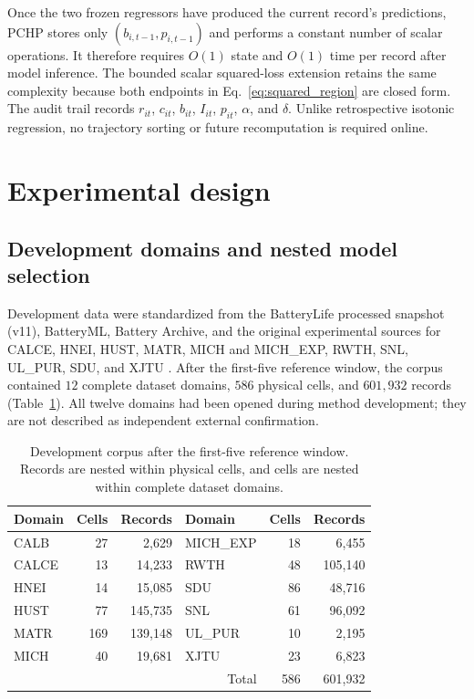 \documentclass[11pt]{article}
\begin{document}
Once the two frozen regressors have produced the current record's predictions, PCHP stores only $(b_{i,t-1},p_{i,t-1})$ and performs a constant number of scalar operations. It therefore requires $O(1)$ state and $O(1)$ time per record after model inference. The bounded scalar squared-loss extension retains the same complexity because both endpoints in Eq.~\eqref{eq:squared_region} are closed form. The audit trail records $r_{it}$, $c_{it}$, $b_{it}$, $I_{it}$, $p_{it}$, $\alpha$, and $\delta$. Unlike retrospective isotonic regression, no trajectory sorting or future recomputation is required online.

\section{Experimental design}

\subsection{Development domains and nested model selection}

Development data were standardized from the BatteryLife processed snapshot (v11), BatteryML, Battery Archive, and the original experimental sources for CALCE, HNEI, HUST, MATR, MICH and MICH\_EXP, RWTH, SNL, UL\_PUR, SDU, and XJTU \citep{zhang2024batteryml,tan2025batterylife,batterylife2026processed,batteryarchive,xing2013ensemble,devie2018variability,ma2022personalized,severson2019cyclelife,attia2020closedloop,weng2021formation,li2021oneshot,preger2020degradation,juarezrobles2020safety,wang2025sorting,wang2024pinn}. After the first-five reference window, the corpus contained $12$ complete dataset domains, $586$ physical cells, and $601{,}932$ records (Table~\ref{tab:data}). All twelve domains had been opened during method development; they are not described as independent external confirmation.

\begin{table}[t]
\centering
\caption{Development corpus after the first-five reference window. Records are nested within physical cells, and cells are nested within complete dataset domains.}
\label{tab:data}
\begin{tabular}{lrr@{\qquad}lrr}
\toprule
Domain & Cells & Records & Domain & Cells & Records \\
\midrule
CALB & 27 & 2,629 & MICH\_EXP & 18 & 6,455 \\
CALCE & 13 & 14,233 & RWTH & 48 & 105,140 \\
HNEI & 14 & 15,085 & SDU & 86 & 48,716 \\
HUST & 77 & 145,735 & SNL & 61 & 96,092 \\
MATR & 169 & 139,148 & UL\_PUR & 10 & 2,195 \\
MICH & 40 & 19,681 & XJTU & 23 & 6,823 \\
\midrule
\multicolumn{4}{r}{Total} & 586 & 601,932 \\
\bottomrule
\end{tabular}
\end{table}
\end{document}

